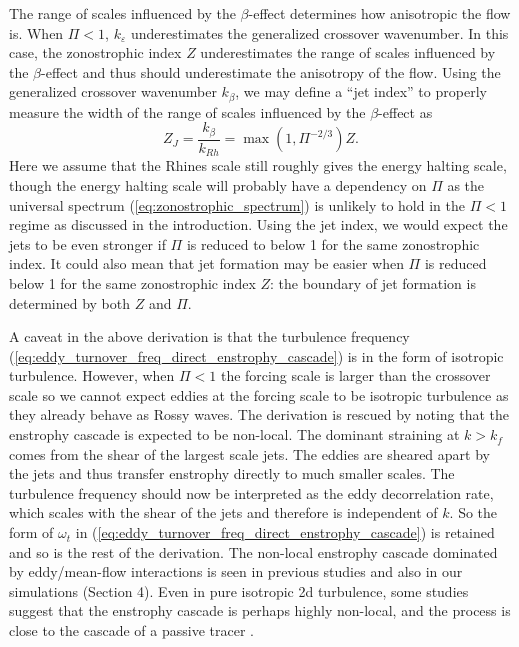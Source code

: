 \documentclass{ametsoc}
\begin{document}
The range of scales influenced by the $\beta$-effect determines
how anisotropic the flow is. When $\Pi<1$, 
$k_{\varepsilon}$ underestimates the generalized crossover wavenumber.
In this case, the zonostrophic index $Z$ underestimates the range
of scales influenced by the $\beta$-effect and thus should underestimate the anisotropy
of the flow. Using the generalized crossover wavenumber $k_{\beta}$,
we may define a ``jet index'' to properly measure the width of the
range of scales influenced by the $\beta$-effect as
\begin{equation}
Z_{J}=\frac{k_{\beta}}{k_{Rh}}=\max(1,\Pi^{-2/3})Z.\label{eq:jet index}
\end{equation}
Here we assume that the Rhines scale still roughly gives the energy
halting scale, though the energy halting scale will probably have a
dependency on $\Pi$ as the universal spectrum (\ref{eq:zonostrophic_spectrum})
is unlikely to hold in the $\Pi<1$ regime as discussed in the introduction. 
Using the jet index, we would
expect the jets to be even stronger if $\Pi$ is reduced to below 1 for
the same zonostrophic index. It could also mean that jet 
formation may be easier when $\Pi$ is reduced
below 1 for the same zonostrophic index $Z$: the boundary of jet
formation is determined by both $Z$ and $\Pi$. 

A caveat in the above derivation is that the turbulence frequency (\ref{eq:eddy_turnover_freq_direct_enstrophy_cascade})
is in the form of isotropic turbulence. However, when $\Pi<1$
the forcing scale is larger than the crossover scale
so we cannot expect eddies at the forcing scale to be isotropic
turbulence as they already behave as Rossy waves.
The derivation is rescued by noting that the enstrophy cascade is expected
to be non-local. The dominant straining at $k>k_{f}$ comes from
the shear of the largest scale jets. The eddies are sheared apart
by the jets and thus transfer enstrophy directly to much smaller scales.
The turbulence frequency should now be interpreted as the eddy
decorrelation rate, which scales with the shear of the jets and therefore
is independent of $k$. So the form of $\omega_{t}$ in (\ref{eq:eddy_turnover_freq_direct_enstrophy_cascade})
is retained and so is the rest of the derivation. The non-local enstrophy
cascade dominated by eddy/mean-flow interactions is seen in previous
studies \citep{Manz2009} and also in our simulations (Section 4).
Even in pure isotropic 2d turbulence, some studies suggest that the enstrophy
cascade is perhaps highly non-local, and the process is close to the cascade
of a passive tracer \citep{Borue1993,Falkovich1994}.
\end{document}
